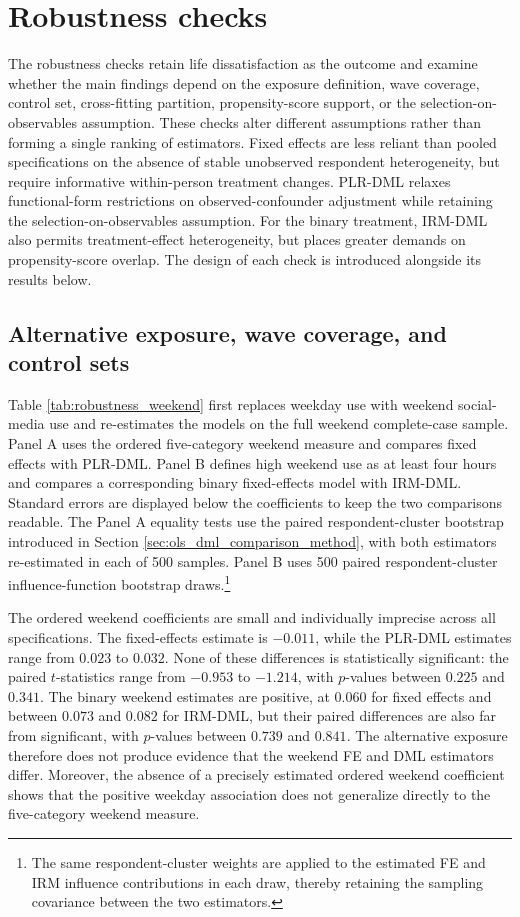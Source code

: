\documentclass[11pt,oneside,a4paper]{book}
\newcommand{\tocsection}[2]{%
  \section[#1]{#2}%
}
\begin{document}
\tocsection{Robustness Checks}{Robustness checks}
\label{sec:robustness_results}

The robustness checks retain life dissatisfaction as the outcome and examine whether the main findings depend on the exposure definition, wave coverage, control set, cross-fitting partition, propensity-score support, or the selection-on-observables assumption. These checks alter different assumptions rather than forming a single ranking of estimators. Fixed effects are less reliant than pooled specifications on the absence of stable unobserved respondent heterogeneity, but require informative within-person treatment changes. PLR-DML relaxes functional-form restrictions on observed-confounder adjustment while retaining the selection-on-observables assumption. For the binary treatment, IRM-DML also permits treatment-effect heterogeneity, but places greater demands on propensity-score overlap. The design of each check is introduced alongside its results below.

\subsection[Alternative Exposure, Wave Coverage, and Control Sets]{Alternative exposure, wave coverage, and control sets}

Table \ref{tab:robustness_weekend} first replaces weekday use with weekend social-media use and re-estimates the models on the full weekend complete-case sample. Panel A uses the ordered five-category weekend measure and compares fixed effects with PLR-DML. Panel B defines high weekend use as at least four hours and compares a corresponding binary fixed-effects model with IRM-DML. Standard errors are displayed below the coefficients to keep the two comparisons readable. The Panel A equality tests use the paired respondent-cluster bootstrap introduced in Section \ref{sec:ols_dml_comparison_method}, with both estimators re-estimated in each of 500 samples. Panel B uses 500 paired respondent-cluster influence-function bootstrap draws.\footnote{The same respondent-cluster weights are applied to the estimated FE and IRM influence contributions in each draw, thereby retaining the sampling covariance between the two estimators.}



The ordered weekend coefficients are small and individually imprecise across all specifications. The fixed-effects estimate is \(-0.011\), while the PLR-DML estimates range from \(0.023\) to \(0.032\). None of these differences is statistically significant: the paired \(t\)-statistics range from \(-0.953\) to \(-1.214\), with \(p\)-values between \(0.225\) and \(0.341\). The binary weekend estimates are positive, at \(0.060\) for fixed effects and between \(0.073\) and \(0.082\) for IRM-DML, but their paired differences are also far from significant, with \(p\)-values between \(0.739\) and \(0.841\). The alternative exposure therefore does not produce evidence that the weekend FE and DML estimators differ. Moreover, the absence of a precisely estimated ordered weekend coefficient shows that the positive weekday association does not generalize directly to the five-category weekend measure.
\end{document}
